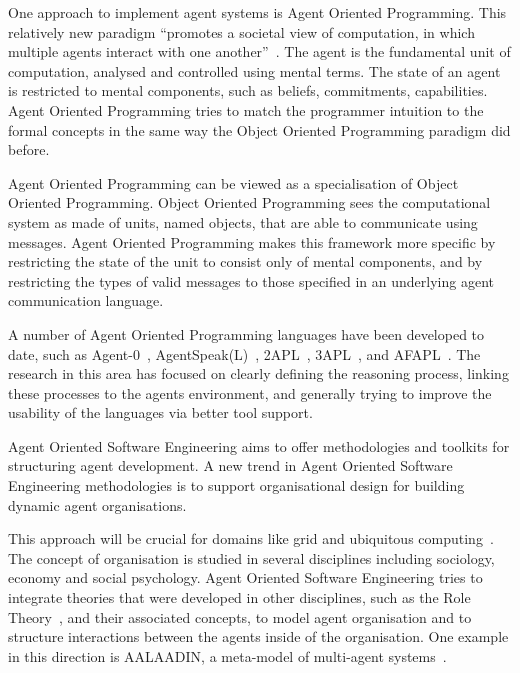 \documentclass[a4paper,12pt,oneside,fleqn]{book} %
\begin{document}
One approach to implement agent systems is Agent Oriented Programming.
This relatively new paradigm ``promotes a societal view of computation, in
which multiple agents interact with one
another''~\cite{DBLP:journals/ai/Shoham93}.  The agent is the fundamental
unit of computation, analysed and controlled using mental terms.  The state
of an agent is restricted to mental components, such as beliefs,
commitments, capabilities. Agent Oriented Programming tries to match the
programmer intuition to the formal concepts in the same way the Object
Oriented Programming paradigm did before.

Agent Oriented Programming can be viewed as a specialisation of Object
Oriented Programming\null. Object Oriented Programming sees the
computational system as made of units, named objects, that are able to
communicate using messages. Agent Oriented Programming makes this framework
more specific by restricting the state of the unit to consist only of
mental components, and by restricting the types of valid messages to those
specified in an underlying agent communication language.

A number of Agent Oriented Programming languages have been developed to
date, such as Agent-0~\cite{DBLP:journals/ai/Shoham93},
AgentSpeak(L)~\cite{DBLP:conf/maamaw/Rao96},
2APL~\cite{DBLP:journals/aamas/Dastani08},
3APL~\cite{DBLP:conf/promas/DastaniRDM03}, and
AFAPL~\cite{DBLP:conf/seke/CollierOR04}. The research in this area has
focused on clearly defining the reasoning process, linking these processes
to the agents environment, and generally trying to improve the usability of
the languages via better tool support.

Agent Oriented Software Engineering aims to offer methodologies and
toolkits for structuring agent development. A new trend in Agent Oriented
Software Engineering methodologies is to support organisational design for
building dynamic agent organisations.

This approach will be crucial for domains like grid and ubiquitous
computing~\cite{luck2005agent}. The concept of organisation is studied in
several disciplines including sociology, economy and social psychology.
Agent Oriented Software Engineering tries to integrate theories that were
developed in other disciplines, such as the Role
Theory~\cite{biddle1986recent}, and their associated concepts, to model
agent organisation and to structure interactions between the agents inside
of the organisation. One example in this direction is AALAADIN, a
meta-model of multi-agent systems~\cite{ferber1998meta}.
\end{document}
